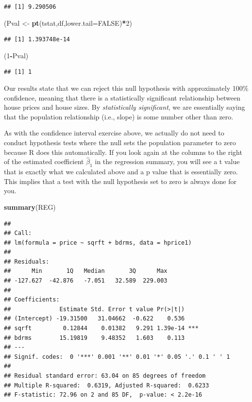 \documentclass[
]{book}
\newenvironment{Shaded}{\begin{snugshade}}{\end{snugshade}}
\newcommand{\AttributeTok}[1]{\textcolor[rgb]{0.13,0.29,0.53}{#1}}
\newcommand{\ConstantTok}[1]{\textcolor[rgb]{0.56,0.35,0.01}{#1}}
\newcommand{\DecValTok}[1]{\textcolor[rgb]{0.00,0.00,0.81}{#1}}
\newcommand{\FunctionTok}[1]{\textcolor[rgb]{0.13,0.29,0.53}{\textbf{#1}}}
\newcommand{\NormalTok}[1]{#1}
\newcommand{\OtherTok}[1]{\textcolor[rgb]{0.56,0.35,0.01}{#1}}
\newcommand{\SpecialCharTok}[1]{\textcolor[rgb]{0.81,0.36,0.00}{\textbf{#1}}}
\begin{document}
\begin{verbatim}
## [1] 9.290506
\end{verbatim}

\begin{Shaded}
\begin{Highlighting}[]
\NormalTok{(Pval }\OtherTok{\textless{}{-}} \FunctionTok{pt}\NormalTok{(tstat,df,}\AttributeTok{lower.tail=}\ConstantTok{FALSE}\NormalTok{)}\SpecialCharTok{*}\DecValTok{2}\NormalTok{)}
\end{Highlighting}
\end{Shaded}

\begin{verbatim}
## [1] 1.393748e-14
\end{verbatim}

\begin{Shaded}
\begin{Highlighting}[]
\NormalTok{(}\DecValTok{1}\SpecialCharTok{{-}}\NormalTok{Pval)}
\end{Highlighting}
\end{Shaded}

\begin{verbatim}
## [1] 1
\end{verbatim}

Our results state that we can reject this null hypothesis with approximately 100\% confidence, meaning that there is a statistically significant relationship between house prices and house sizes. By \emph{statistically significant}, we are essentially saying that the population relationship (i.e., slope) is some number other than zero.

As with the confidence interval exercise above, we actually do not need to conduct hypothesis tests where the null sets the population parameter to zero because R does this automatically. If you look again at the columns to the right of the estimated coefficient \(\hat{\beta}_1\) in the regression summary, you will see a t value that is exactly what we calculated above and a p value that is essentially zero. This implies that a test with the null hypothesis set to zero is always done for you.

\begin{Shaded}
\begin{Highlighting}[]
\FunctionTok{summary}\NormalTok{(REG)}
\end{Highlighting}
\end{Shaded}

\begin{verbatim}
## 
## Call:
## lm(formula = price ~ sqrft + bdrms, data = hprice1)
## 
## Residuals:
##      Min       1Q   Median       3Q      Max 
## -127.627  -42.876   -7.051   32.589  229.003 
## 
## Coefficients:
##              Estimate Std. Error t value Pr(>|t|)    
## (Intercept) -19.31500   31.04662  -0.622    0.536    
## sqrft         0.12844    0.01382   9.291 1.39e-14 ***
## bdrms        15.19819    9.48352   1.603    0.113    
## ---
## Signif. codes:  0 '***' 0.001 '**' 0.01 '*' 0.05 '.' 0.1 ' ' 1
## 
## Residual standard error: 63.04 on 85 degrees of freedom
## Multiple R-squared:  0.6319, Adjusted R-squared:  0.6233 
## F-statistic: 72.96 on 2 and 85 DF,  p-value: < 2.2e-16
\end{verbatim}
\end{document}
